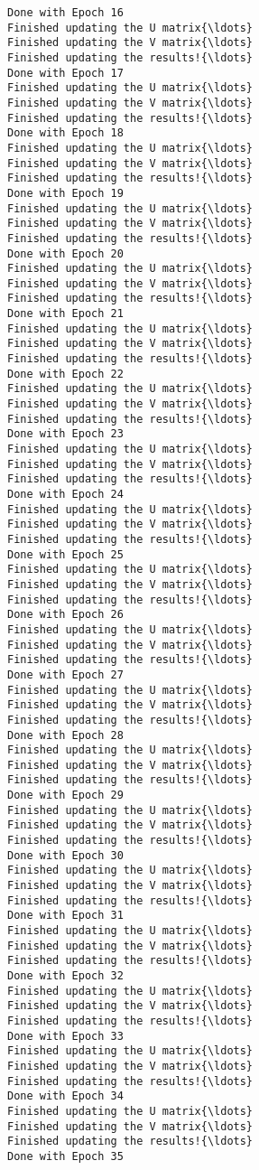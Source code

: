 \documentclass{article}
\begin{document}
\begin{Verbatim}[commandchars=\\\{\}]
Done with Epoch 16
Finished updating the U matrix{\ldots}
Finished updating the V matrix{\ldots}
Finished updating the results!{\ldots}
Done with Epoch 17
Finished updating the U matrix{\ldots}
Finished updating the V matrix{\ldots}
Finished updating the results!{\ldots}
Done with Epoch 18
Finished updating the U matrix{\ldots}
Finished updating the V matrix{\ldots}
Finished updating the results!{\ldots}
Done with Epoch 19
Finished updating the U matrix{\ldots}
Finished updating the V matrix{\ldots}
Finished updating the results!{\ldots}
Done with Epoch 20
Finished updating the U matrix{\ldots}
Finished updating the V matrix{\ldots}
Finished updating the results!{\ldots}
Done with Epoch 21
Finished updating the U matrix{\ldots}
Finished updating the V matrix{\ldots}
Finished updating the results!{\ldots}
Done with Epoch 22
Finished updating the U matrix{\ldots}
Finished updating the V matrix{\ldots}
Finished updating the results!{\ldots}
Done with Epoch 23
Finished updating the U matrix{\ldots}
Finished updating the V matrix{\ldots}
Finished updating the results!{\ldots}
Done with Epoch 24
Finished updating the U matrix{\ldots}
Finished updating the V matrix{\ldots}
Finished updating the results!{\ldots}
Done with Epoch 25
Finished updating the U matrix{\ldots}
Finished updating the V matrix{\ldots}
Finished updating the results!{\ldots}
Done with Epoch 26
Finished updating the U matrix{\ldots}
Finished updating the V matrix{\ldots}
Finished updating the results!{\ldots}
Done with Epoch 27
Finished updating the U matrix{\ldots}
Finished updating the V matrix{\ldots}
Finished updating the results!{\ldots}
Done with Epoch 28
Finished updating the U matrix{\ldots}
Finished updating the V matrix{\ldots}
Finished updating the results!{\ldots}
Done with Epoch 29
Finished updating the U matrix{\ldots}
Finished updating the V matrix{\ldots}
Finished updating the results!{\ldots}
Done with Epoch 30
Finished updating the U matrix{\ldots}
Finished updating the V matrix{\ldots}
Finished updating the results!{\ldots}
Done with Epoch 31
Finished updating the U matrix{\ldots}
Finished updating the V matrix{\ldots}
Finished updating the results!{\ldots}
Done with Epoch 32
Finished updating the U matrix{\ldots}
Finished updating the V matrix{\ldots}
Finished updating the results!{\ldots}
Done with Epoch 33
Finished updating the U matrix{\ldots}
Finished updating the V matrix{\ldots}
Finished updating the results!{\ldots}
Done with Epoch 34
Finished updating the U matrix{\ldots}
Finished updating the V matrix{\ldots}
Finished updating the results!{\ldots}
Done with Epoch 35

\end{Verbatim}
\end{document}
